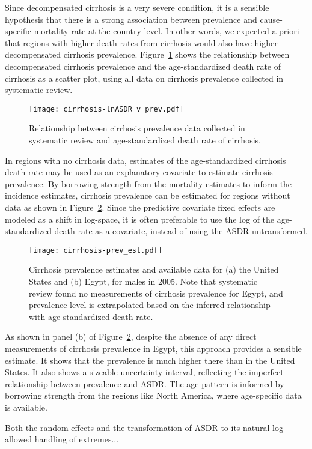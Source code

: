 Since decompensated cirrhosis is a very severe condition, it is a
sensible hypothesis that there is a strong association between
prevalence and cause-specific mortality rate at the country level.  In
other words, we expected a priori that regions with higher death rates
from cirrhosis would also have higher decompensated cirrhosis prevalence.  
Figure~\ref{fig:app-cirrhosis asp} shows the relationship between decompensated cirrhosis
prevalence and the age-standardized death rate of cirrhosis as a
scatter plot, using all data on cirrhosis prevalence collected in
systematic review.

    \begin{figure}[h]
        \begin{center}
            \texttt{[image: cirrhosis-lnASDR\_v\_prev.pdf]}
            \caption{Relationship between cirrhosis prevalence data
              collected in systematic review and age-standardized
              death rate of cirrhosis.}
            \label{fig:app-cirrhosis asp}
        \end{center}
    \end{figure}

In regions with no cirrhosis data, estimates of the age-standardized
cirrhosis death rate may be used as an explanatory covariate to
estimate cirrhosis prevalence.  By borrowing strength from the
mortality estimates to inform the incidence estimates, cirrhosis
prevalence can be estimated for regions without data as shown in
Figure~\ref{fig:app-cirrhosis prev est}.  Since the predictive
covariate fixed effects are modeled as a shift in log-space, it is
often preferable to use the log of the age-standardized death rate as
a covariate, instead of using the ASDR untransformed.

    \begin{figure}[h]
        \begin{center}
            \texttt{[image: cirrhosis-prev\_est.pdf]}
            \caption{Cirrhosis prevalence estimates and available data
              for (a) the United States and (b) Egypt, for males
              in 2005. Note that systematic review found no
              measurements of cirrhosis prevalence for Egypt, and
              prevalence level is extrapolated based on the inferred
              relationship with age-standardized death rate.}
            \label{fig:app-cirrhosis prev est}
        \end{center}
    \end{figure}

As shown in panel (b) of Figure~\ref{fig:app-cirrhosis prev est},
despite the absence of any direct measurements of cirrhosis prevalence
in Egypt, this approach provides a sensible estimate.  It shows that
the prevalence is much higher there than in the United States.  It
also shows a sizeable uncertainty interval, reflecting the imperfect
relationship between prevalence and ASDR.  The age pattern is informed
by borrowing strength from the regions like North America, where
age-specific data is available.

Both the random effects and the transformation of ASDR to its natural log allowed handling of extremes...
